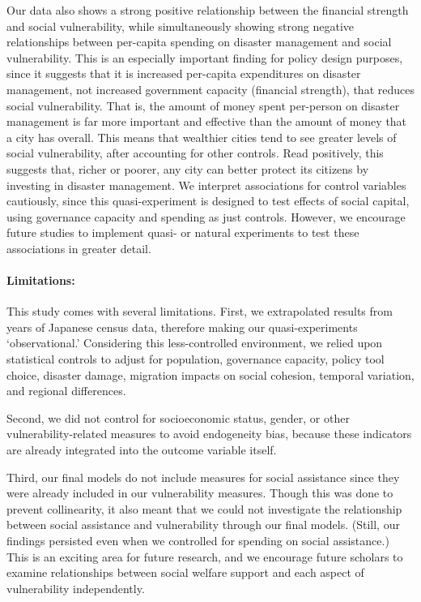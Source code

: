 \documentclass[]{elsarticle} %
\begin{document}
Our data also shows a strong positive relationship between the financial
strength and social vulnerability, while simultaneously showing strong
negative relationships between per-capita spending on disaster
management and social vulnerability. This is an especially important
finding for policy design purposes, since it suggests that it is
increased per-capita expenditures on disaster management, not increased
government capacity (financial strength), that reduces social
vulnerability. That is, the amount of money spent per-person on disaster
management is far more important and effective than the amount of money
that a city has overall. This means that wealthier cities tend to see
greater levels of social vulnerability, after accounting for other
controls. Read positively, this suggests that, richer or poorer, any
city can better protect its citizens by investing in disaster
management. We interpret associations for control variables cautiously,
since this quasi-experiment is designed to test effects of social
capital, using governance capacity and spending as just controls.
However, we encourage future studies to implement quasi- or natural
experiments to test these associations in greater detail.

\hypertarget{limitations}{%
\paragraph{Limitations:}\label{limitations}}

This study comes with several limitations. First, we extrapolated
results from years of Japanese census data, therefore making our
quasi-experiments `observational.' Considering this less-controlled
environment, we relied upon statistical controls to adjust for
population, governance capacity, policy tool choice, disaster damage,
migration impacts on social cohesion, temporal variation, and regional
differences.

Second, we did not control for socioeconomic status, gender, or other
vulnerability-related measures to avoid endogeneity bias, because these
indicators are already integrated into the outcome variable itself.

Third, our final models do not include measures for social assistance
since they were already included in our vulnerability measures. Though
this was done to prevent collinearity, it also meant that we could not
investigate the relationship between social assistance and vulnerability
through our final models. (Still, our findings persisted even when we
controlled for spending on social assistance.) This is an exciting area
for future research, and we encourage future scholars to examine
relationships between social welfare support and each aspect of
vulnerability independently.
\end{document}
